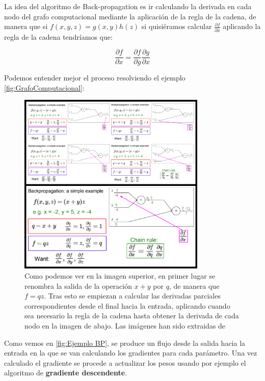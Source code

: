         \medskip

        \noindent La idea del algoritmo de Back-propagation es ir calculando la derivada en cada nodo del grafo computacional mediante la aplicación de la regla de la cadena, de manera que si $f(x,y,z)=g(x,y)h(z)$ si quisiéramos calcular $\frac{\partial f}{\partial x}$ aplicando la regla de la cadena tendríamos que: 

        \begin{equation}
            \frac{\partial f}{\partial x}= \frac{\partial f}{\partial g} \frac{\partial g}{\partial x}
        \end{equation}

        
        Podemos entender mejor el proceso resolviendo el ejemplo \autoref{fig:GrafoComputacional}: 

        \begin{figure}[!h]
            \centering
            \includegraphics[width=0.8\textwidth]{img/BP_ejemplo.png}
            \caption{Como podemos ver en la imagen superior, en primer lugar se renombra la salida de la operación $x+y$ por $q$, de manera que $f=qz$. Tras esto se empiezan a calcular las derivadas parciales correspondientes desde el final hacia la entrada, aplicando cuando sea necesario la regla de la cadena hasta obtener la derivada de cada nodo en la imagen de abajo. Las imágenes han sido extraidas de \cite{StanfordCourse}}
            \label{fig:Ejemplo BP}
        \end{figure}

        \noindent Como vemos en \autoref{fig:Ejemplo BP}, se produce un flujo desde la salida hacia la entrada en la que se van calculando los gradientes para cada parámetro. Una vez calculado el gradiente se procede a actualizar los pesos usando por ejemplo el algoritmo de \textbf{gradiente descendente}.
    
